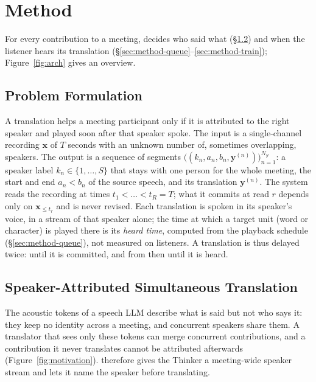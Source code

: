 \section{Method}
\label{sec:method}



For every contribution to a meeting, \sys{} decides who said what (\S\ref{sec:method-thinker}) and when the listener
hears its translation (\S\ref{sec:method-queue}--\ref{sec:method-train}); Figure~\ref{fig:arch} gives an overview.

\subsection{Problem Formulation}
\label{sec:method-task}

A translation helps a meeting participant only if it is attributed to the right speaker and played soon after that
speaker spoke. The input is a single-channel recording $\bm{x}$ of $T$ seconds with an unknown number of, sometimes
overlapping, speakers. The output is a sequence of segments $\big((k_n,a_n,b_n,\bm{y}^{(n)})\big)_{n=1}^{N_\mathcal{Y}}$:
a speaker label $k_n\in\{1,\dots,S\}$ that stays with one person for the whole meeting, the start and end $a_n<b_n$ of
the source speech, and its translation $\bm{y}^{(n)}$. The system reads the recording at times $t_1<\dots<t_R=T$; what it
commits at read $r$ depends only on $\bm{x}_{\le t_r}$ and is never revised. Each translation is spoken in its
speaker's voice, in a stream of that speaker alone; the time at which a target unit (word or character) is played
there is its \emph{heard time}, computed from the playback schedule (\S\ref{sec:method-queue}), not measured on
listeners. A translation is thus delayed twice: until it is committed, and from then until it is heard.

\subsection{Speaker-Attributed Simultaneous Translation}
\label{sec:method-thinker}

The acoustic tokens of a speech LLM describe what is said but not who says it: they keep no identity across a meeting,
and concurrent speakers share them. A translator that sees only these tokens can merge concurrent contributions, and a
contribution it never translates cannot be attributed afterwards (Figure~\ref{fig:motivation}). \sys{} therefore gives
the Thinker a meeting-wide speaker stream and lets it name the speaker before translating.

